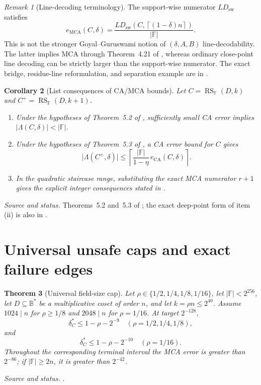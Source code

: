 \documentclass[11pt,a4paper]{amsart}
\numberwithin{equation}{section}
\newtheorem{theorem}{Theorem}[section]
\newtheorem{corollary}[theorem]{Corollary}
\theoremstyle{remark}
\newtheorem{remark}[theorem]{Remark}
\DeclareMathOperator{\RS}{RS}
\DeclareMathOperator{\MCA}{MCA}
\DeclareMathOperator{\CA}{CA}
\newcommand{\F}{\mathbb F}
\newcommand{\B}{\mathbb B}
\newcommand{\abs}[1]{\lvert#1\rvert}
\newcommand{\ceil}[1]{\left\lceil#1\right\rceil}
\newcommand{\source}[1]{\par\smallskip\noindent\textit{Source and status.} #1\par}
\begin{document}
\begin{remark}[Line-decoding terminology]\label{rem:line}
The support-wise numerator $LD_{\mathrm{sw}}$ satisfies
\[
 e_{\MCA}(C,\delta)=\frac{LD_{\mathrm{sw}}(C,\ceil{(1-\delta)n})}{\abs\F}.
\]
This is not the stronger Goyal--Guruswami notion of $(\delta,A,B)$ line-decodability.  The latter implies MCA through Theorem~4.21 of \cite{ABF26}, whereas ordinary close-point line decoding can be strictly larger than the support-wise numerator.  The exact bridge, residue-line reformulation, and separation example are in \cite{LineBridge26}.
\end{remark}

\begin{corollary}[List consequences of CA/MCA bounds]\label{cor:abf}
Let $C=\RS_{\F}(D,k)$ and $C^+=\RS_{\F}(D,k+1)$.
\begin{enumerate}[label=\textup{(\roman*)},leftmargin=*]
\item Under the hypotheses of Theorem~5.2 of \cite{ABF26}, sufficiently small CA error implies $\abs{\Lambda(C,\delta)}<\abs\F$.
\item Under the hypotheses of Theorem~5.3 of \cite{ABF26}, a CA error bound for $C$ gives
\[
 \abs{\Lambda(C^+,\delta)}
 \le\ceil{\frac{\abs\F}{1-\eta}\,e_{\CA}(C,\delta)}.
\]
\item In the quadratic staircase range, substituting the exact MCA numerator $r+1$ gives the explicit integer consequences stated in \cite[Line decoding and list-decoding consequences]{ChoThresholds26}.
\end{enumerate}
\end{corollary}
\source{Theorems~5.2 and~5.3 of \cite{ABF26}; the exact deep-point form of item (ii) is also in \cite{ChoCap26}.}

\section{Universal unsafe caps and exact failure edges}

\begin{theorem}[Universal field-size cap]\label{thm:cap}
Let $\rho\in\{1/2,1/4,1/8,1/16\}$, let $\abs\F<2^{256}$, let $D\subseteq\B^*$ be a multiplicative coset of order $n$, and let $k=\rho n\le2^{40}$.  Assume $1024\mid n$ for $\rho\ge1/8$ and $2048\mid n$ for $\rho=1/16$.  At target $2^{-128}$,
\[
 \delta_C^*\le1-\rho-2^{-9}
 \quad(\rho=1/2,1/4,1/8),
\]
and
\[
 \delta_C^*\le1-\rho-2^{-10}
 \quad(\rho=1/16).
\]
Throughout the corresponding terminal interval the MCA error is greater than $2^{-86}$; if $\abs\F\ge2n$, it is greater than $2^{-42}$.
\end{theorem}
\source{\cite[Universal field-size cap]{ChoCap26}.}
\end{document}
